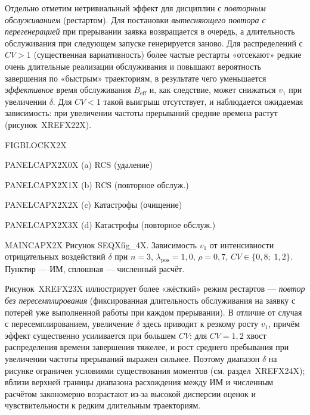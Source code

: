 Отдельно отметим нетривиальный эффект для дисциплин с \emph{повторным обслуживанием} (рестартом). Для постановки \emph{вытесняющего повтора с перегенерацией} при прерывании заявка возвращается в очередь, а длительность обслуживания при следующем запуске генерируется заново. Для распределений с \(CV>1\) (существенная вариативность) более частые рестарты «отсекают» редкие очень длительные реализации обслуживания и повышают вероятность завершения по «быстрым» траекториям, в результате чего уменьшается \emph{эффективное} время обслуживания \(B_{\mathrm{eff}}\) и, как следствие, может снижаться \(v_1\) при увеличении \(\delta\). Для \(CV<1\) такой выигрыш отсутствует, и наблюдается ожидаемая зависимость: при увеличении частоты прерываний средние времена растут (рисунок~XREFX22X).

\noindent FIGBLOCKX2X\par

\noindent PANELCAPX2X0X (a) RCS (удаление)\par

\noindent PANELCAPX2X1X (b) RCS (повторное обслуж.)\par

\noindent PANELCAPX2X2X (c) Катастрофы (очищение)\par

\noindent PANELCAPX2X3X (d) Катастрофы (повторное обслуж.)\par

\noindent MAINCAPX2X Рисунок SEQXfig_4X. Зависимость \(v_1\) от интенсивности отрицательных воздействий \(\delta\) при \(n=3\), \(\lambda_{\text{pos}}=1{,}0\), \(\rho=0{,}7\), \(CV\in\{0{,}8;\;1{,}2\}\). Пунктир --- ИМ, сплошная --- численный расчёт.\par

Рисунок~XREFX23X иллюстрирует более «жёсткий» режим рестартов --- \emph{повтор без пересемплирования} (фиксированная длительность обслуживания на заявку с потерей уже выполненной работы при каждом прерывании). В отличие от случая с пересемплированием, увеличение \(\delta\) здесь приводит к резкому росту \(v_1\), причём эффект существенно усиливается при большем \(CV\): для \(CV=1{,}2\) хвост распределения времени завершения тяжелее, и рост среднего пребывания при увеличении частоты прерываний выражен сильнее. Поэтому диапазон \(\delta\) на рисунке ограничен условиями существования моментов (см. раздел~XREFX24X); вблизи верхней границы диапазона расхождения между ИМ и численным расчётом закономерно возрастают из-за высокой дисперсии оценок и чувствительности к редким длительным траекториям.

